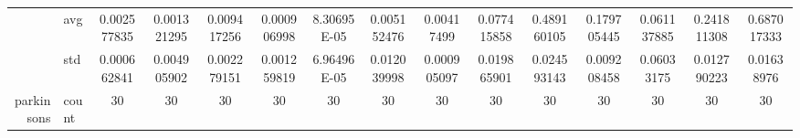 \begin{table}[H]
{\begin{tabular}{rlccc|c|c|c|c|c|ccccc}
			                                                                               & avg                & \cellcolor[rgb]{ .549,  .792,  .49}0.002577835                                 & \cellcolor[rgb]{ .467,  .765,  .486}0.001321295                                & \cellcolor[rgb]{ 1,  .922,  .518}0.009417256                                   & \cellcolor[rgb]{ .439,  .757,  .482}0.000906998 & \cellcolor[rgb]{ .388,  .745,  .482}\textcolor[rgb]{ 0,  .38,  0}{8.30695E-05} & \cellcolor[rgb]{ .718,  .839,  .498}0.005152476 & \cellcolor[rgb]{ .655,  .82,  .494}0.00417499                                  & \cellcolor[rgb]{ 1,  .871,  .51}0.077415858     & \cellcolor[rgb]{ .984,  .561,  .451}0.489160105 & \cellcolor[rgb]{ .996,  .796,  .494}0.179705445 & \cellcolor[rgb]{ 1,  .886,  .514}0.061137885    & \cellcolor[rgb]{ .992,  .749,  .486}0.241811308 & \cellcolor[rgb]{ .973,  .412,  .42}0.687017333  \\
			                                                                               & std                & 0.000662841                                                                    & 0.004905902                                                                    & 0.002279151                                                                    & 0.001259819                                     & 6.96496E-05                                                                    & 0.012039998                                     & 0.000905097                                                                    & 0.019865901                                     & 0.024593143                                     & 0.009208458                                     & 0.06033175                                      & 0.012790223                                     & 0.01638976                                      \\
			parkinsons                                                                     & count              & 30                                                                             & 30                                                                             & 30                                                                             & 30                                              & 30                                                                             & 30                                              & 30                                                                             & 30                                              & 30                                              & 30                                              & 30                                              & 30                                              & 30                                              \\

\end{tabular}}
\end{table}

